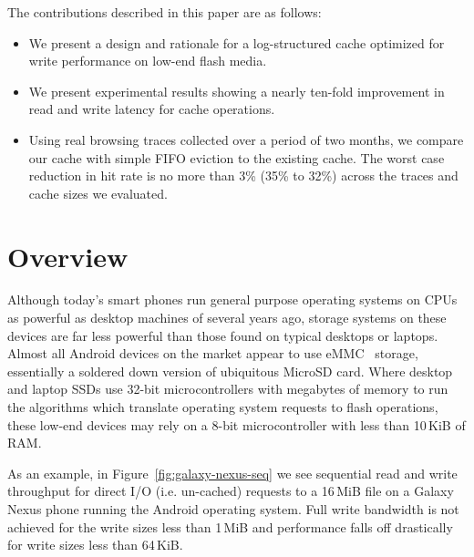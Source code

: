 \documentclass{sig-alternate}
\begin{document}
The contributions described in this paper are as follows:

\begin{itemize}

  \item We present a design and rationale for a log-structured cache optimized
    for write performance on low-end flash media.

  \item We present experimental results showing a nearly ten-fold improvement in
    read and write latency for cache operations.

  \item Using real browsing traces collected over a period of two months, we
    compare our cache with simple FIFO eviction to the existing cache.  The
    worst case reduction in hit rate is no more than 3\% (35\% to 32\%) across
    the traces and cache sizes we evaluated.

\end{itemize}

\section{Overview}
Although today's smart phones run general purpose operating systems on CPUs as
powerful as desktop machines of several years ago, storage systems on these
devices are far less powerful than those found on typical desktops or laptops.
Almost all Android devices on the market appear to use eMMC~\cite{emmc_2010}
storage, essentially a soldered down version of ubiquitous MicroSD card.  Where
desktop and laptop SSDs use 32-bit microcontrollers with megabytes of memory to
run the algorithms which translate operating system requests to flash
operations, these low-end devices may rely on a 8-bit microcontroller with less
than 10\,KiB of RAM.

As an example, in Figure~\ref{fig:galaxy-nexus-seq} we see sequential read and
write throughput for direct I/O (i.e. un-cached) requests to a 16\,MiB file on a
Galaxy Nexus phone running the Android operating system. Full write bandwidth is
not achieved for the write sizes less than 1\,MiB and performance falls off
drastically for write sizes less than 64\,KiB.
\end{document}
